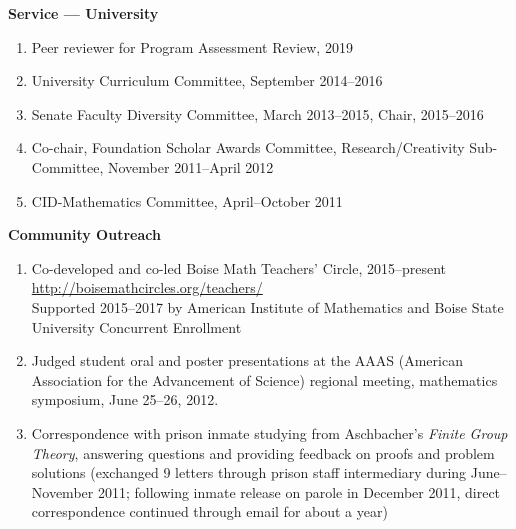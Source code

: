 \documentclass[12pt]{article}
\begin{document}
\textbf{Service --- University}
\begin{enumerate}[revarabic,labelwidth=*]
\item Peer reviewer for Program Assessment Review, 2019

\item University Curriculum Committee, September 2014--2016

\item Senate Faculty Diversity Committee, March 2013--2015, Chair, 2015--2016

\item Co-chair, Foundation Scholar Awards Committee, Research/Creativity Sub-Committee, Nov\-ember 2011--April 2012

\item CID-Mathematics Committee, April--October 2011
\end{enumerate}

\textbf{Community Outreach}
\begin{enumerate}[revarabic,labelwidth=*]
\item Co-developed and co-led Boise Math Teachers' Circle, 2015--present \\
\url{http://boisemathcircles.org/teachers/} \\
Supported 2015--2017 by American Institute of Mathematics and Boise State University Concurrent Enrollment

\item Judged student oral and poster presentations
at the AAAS (American Association for the Advancement of Science)
regional meeting, mathematics symposium,
June 25--26, 2012.

\item Correspondence with prison inmate studying from Aschbacher's \textit{Finite Group Theory},
answering questions and providing feedback on proofs and problem solutions
(exchanged 9 letters through prison staff intermediary during June--November 2011;
following inmate release on parole in December 2011, direct correspondence continued through email for about a year)

\end{enumerate}
\end{document}

